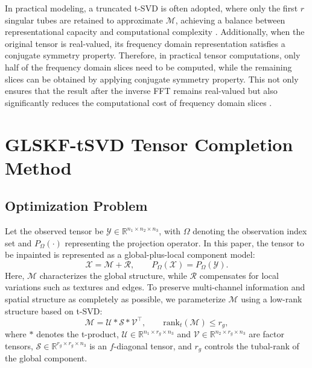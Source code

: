 \documentclass[a4paper,12pt]{article}
\numberwithin{equation}{section}
\numberwithin{algorithm}{section}
\theoremstyle{remark}
\theoremstyle{definition}
\begin{document}
In practical modeling, a truncated t-SVD is often adopted, where only the first \( r \) singular tubes are retained to approximate \( \mathcal{M} \), achieving a balance between representational capacity and computational complexity \cite{zhang2017tsvd}.  
Additionally, when the original tensor is real-valued, its frequency domain representation satisfies a conjugate symmetry property. Therefore, in practical tensor computations, only half of the frequency domain slices need to be computed, while the remaining slices can be obtained by applying conjugate symmetry property. This not only ensures that the result after the inverse FFT remains real-valued but also significantly reduces the computational cost of frequency domain slices \cite{kilmer2013operators}.





\section{GLSKF-tSVD Tensor Completion Method}
\subsection{Optimization Problem}
Let the observed tensor be $\mathcal{Y}\in\mathbb{R}^{n_1\times n_2\times n_3}$, with $\Omega$ denoting the observation index set and $P_{\Omega}(\cdot)$ representing the projection operator. In this paper, the tensor to be inpainted is represented as a global-plus-local component model:
\begin{equation}
	\mathcal{X}=\mathcal{M}+\mathcal{R},\qquad P_{\Omega}(\mathcal{X})=P_{\Omega}(\mathcal{Y}).
	\label{eq:add_model}
\end{equation}
Here, $\mathcal{M}$ characterizes the global structure, while $\mathcal{R}$ compensates for local variations such as textures and edges. To preserve multi-channel information and spatial structure as completely as possible, we parameterize $\mathcal{M}$ using a low-rank structure based on  t-SVD:
\begin{equation}
	\mathcal{M}=\mathcal{U}*\mathcal{S}*\mathcal{V}^{\top},\qquad \mathrm{rank}_t(\mathcal{M})\le r_g,
	\label{eq:global_tsvd}
\end{equation}
where $*$ denotes the  t-product, $\mathcal{U}\in\mathbb{R}^{n_1\times r_g\times n_3}$ and $\mathcal{V}\in\mathbb{R}^{n_2\times r_g\times n_3}$ are factor tensors, $\mathcal{S}\in\mathbb{R}^{r_g\times r_g\times n_3}$ is an $f$-diagonal tensor, and $r_g$ controls the tubal-rank of the global component\cite{kilmer2011factorization,zhang2017tsvd}.
\end{document}
